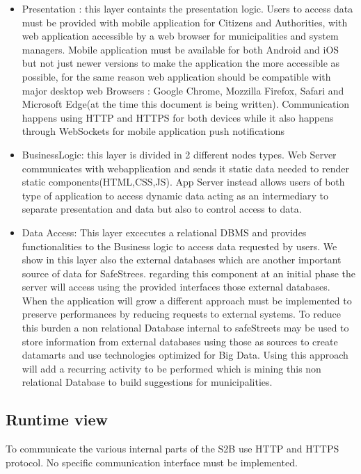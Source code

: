 \begin{itemize}
\item Presentation : this layer containts the presentation logic. Users to access data must be provided with mobile application for Citizens and Authorities, with web application accessible by a web browser for municipalities and system managers.
Mobile application must be available for both Android and iOS but not just newer versions to make the application the more accessible as possible, for the same reason web application should be compatible with major desktop web Browsers  : Google Chrome, Mozzilla Firefox, Safari and Microsoft Edge(at the time this document is being written).
Communication happens using HTTP and HTTPS for both devices while it also happens through WebSockets for mobile application push notifications
\item BusinessLogic: this layer is divided in 2 different nodes types. Web Server communicates with webapplication and sends it static data needed to render static components(HTML,CSS,JS). App Server instead allows users of both type of application to access dynamic data acting as an intermediary to separate presentation and data but also to control access to data.
\item Data Access: This layer excecutes a relational DBMS and provides functionalities to the Business logic to access data requested by users. We show in this layer also the external databases which are another important source of data for SafeStrees.
regarding this component at an initial phase the server will access using the provided interfaces those external databases. When the application will grow a different approach must be implemented to preserve performances by reducing requests to external systems. To reduce this burden a non relational Database internal to safeStreets may be used to store information from external databases using those as sources to create datamarts and use technologies optimized for Big Data. Using this approach will add a recurring activity to be performed which is mining this non relational Database to build suggestions for municipalities.
\end{itemize}
\subsection{Runtime view}
To communicate the various internal parts of the S2B use HTTP and HTTPS protocol. No specific communication interface must be implemented.
